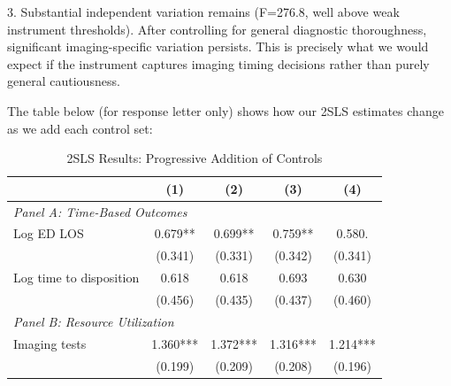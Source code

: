 \documentclass[11pt]{article}
\newcommand{\1}{\hbox{\rm 1\kern-.35em 1}}
\begin{document}
3. Substantial independent variation remains (F=276.8, well above weak instrument thresholds). After controlling for general diagnostic thoroughness, significant imaging-specific variation persists. This is precisely what we would expect if the instrument captures imaging timing decisions rather than purely general cautiousness.

The table below (for response letter only) shows how our 2SLS estimates change as we add each control set:

\begin{table}[H]
\centering
\caption*{2SLS Results: Progressive Addition of Controls}
\begin{threeparttable}
\small
\begin{tabular}{lcccc}
\toprule
& (1) & (2) & (3) & (4) \\
\midrule
\multicolumn{4}{l}{\textit{Panel A: Time-Based Outcomes}} \\[0.5em]
Log ED LOS & 0.679** & 0.699** & 0.759**  & 0.580. \\
& (0.341) & (0.331) & (0.342)  & (0.341) \\[0.5em]
Log time to disposition & 0.618 & 0.618 & 0.693 & 0.630 \\
& (0.456) & (0.435) & (0.437)  & (0.460) \\[0.5em]

\multicolumn{4}{l}{\textit{Panel B: Resource Utilization}} \\[0.5em]
Imaging tests & 1.360*** & 1.372*** & 1.316***  & 1.214*** \\
& (0.199) & (0.209) & (0.208) & (0.196) \\[0.5em]


\end{tabular}
\end{threeparttable}
\end{table}
\end{document}
